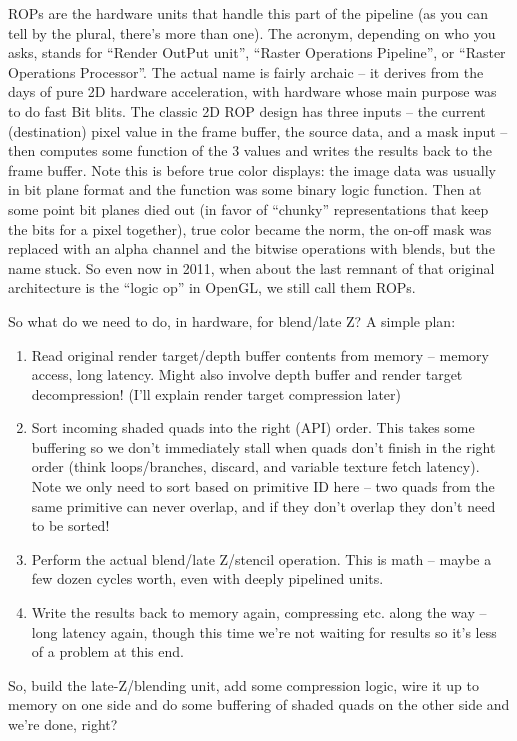 \documentclass[12pt]{article}
\begin{document}
ROPs are the hardware units that handle this part of the pipeline (as you can tell by the plural, there’s more than one). The acronym, depending on who you asks, stands for “Render OutPut unit”, “Raster Operations Pipeline”, or “Raster Operations Processor”. The actual name is fairly archaic – it derives from the days of pure 2D hardware acceleration, with hardware whose main purpose was to do fast Bit blits. The classic 2D ROP design has three inputs – the current (destination) pixel value in the frame buffer, the source data, and a mask input – then computes some function of the 3 values and writes the results back to the frame buffer. Note this is before true color displays: the image data was usually in bit plane format and the function was some binary logic function. Then at some point bit planes died out (in favor of “chunky” representations that keep the bits for a pixel together), true color became the norm, the on-off mask was replaced with an alpha channel and the bitwise operations with blends, but the name stuck. So even now in 2011, when about the last remnant of that original architecture is the “logic op” in OpenGL, we still call them ROPs.

So what do we need to do, in hardware, for blend/late Z? A simple plan:

\begin{enumerate}
\item Read original render target/depth buffer contents from memory – memory access, long latency. Might also involve depth buffer and render target decompression! (I’ll explain render target compression later)
\item Sort incoming shaded quads into the right (API) order. This takes some buffering so we don’t immediately stall when quads don’t finish in the right order (think loops/branches, discard, and variable texture fetch latency). Note we only need to sort based on primitive ID here – two quads from the same primitive can never overlap, and if they don’t overlap they don’t need to be sorted!
\item Perform the actual blend/late Z/stencil operation. This is math – maybe a few dozen cycles worth, even with deeply pipelined units.
\item Write the results back to memory again, compressing etc. along the way – long latency again, though this time we’re not waiting for results so it’s less of a problem at this end.
\end{enumerate}

So, build the late-Z/blending unit, add some compression logic, wire it up to memory on one side and do some buffering of shaded quads on the other side and we’re done, right?
\end{document}
